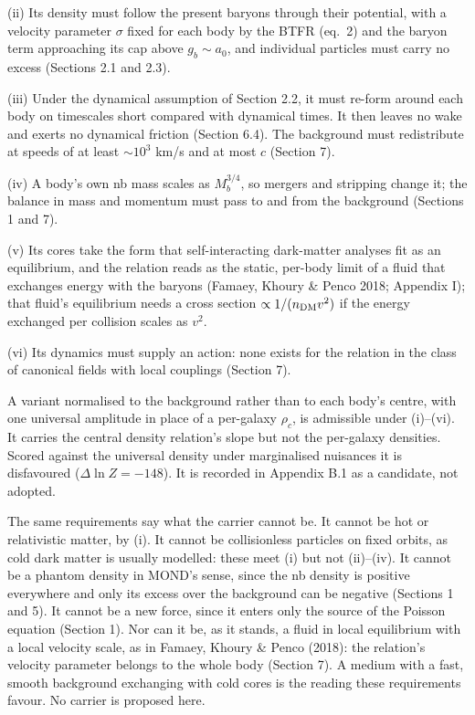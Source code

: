 \documentclass[
  10pt,
]{article}
\begin{document}
(ii) Its density must follow the present baryons through their potential, with a velocity parameter $\sigma$ fixed for each body by the BTFR (eq.~2) and the baryon term approaching its cap above $g_b\sim a_0$, and individual particles must carry no excess (Sections 2.1 and 2.3).

(iii) Under the dynamical assumption of Section 2.2, it must re-form around each body on timescales short compared with dynamical times. It then leaves no wake and exerts no dynamical friction (Section 6.4). The background must redistribute at speeds of at least $\sim10^3$ km/s and at most $c$ (Section 7).

(iv) A body's own nb mass scales as $M_b^{3/4}$, so mergers and stripping change it; the balance in mass and momentum must pass to and from the background (Sections 1 and 7).

(v) Its cores take the form that self-interacting dark-matter analyses fit as an equilibrium, and the relation reads as the static, per-body limit of a fluid that exchanges energy with the baryons (Famaey, Khoury \& Penco 2018; Appendix I); that fluid's equilibrium needs a cross section $\propto1/(n_{\rm DM}v^2)$ if the energy exchanged per collision scales as $v^2$.

(vi) Its dynamics must supply an action: none exists for the relation in the class of canonical fields with local couplings (Section 7).

A variant normalised to the background rather than to each body's centre, with one universal amplitude in place of a per-galaxy $\rho_c$, is admissible under (i)--(vi). It carries the central density relation's slope but not the per-galaxy densities. Scored against the universal density under marginalised nuisances it is disfavoured ($\Delta\ln Z=-148$). It is recorded in Appendix B.1 as a candidate, not adopted.

The same requirements say what the carrier cannot be. It cannot be hot or relativistic matter, by (i). It cannot be collisionless particles on fixed orbits, as cold dark matter is usually modelled: these meet (i) but not (ii)--(iv). It cannot be a phantom density in MOND's sense, since the nb density is positive everywhere and only its excess over the background can be negative (Sections 1 and 5). It cannot be a new force, since it enters only the source of the Poisson equation (Section 1). Nor can it be, as it stands, a fluid in local equilibrium with a local velocity scale, as in Famaey, Khoury \& Penco (2018): the relation's velocity parameter belongs to the whole body (Section 7). A medium with a fast, smooth background exchanging with cold cores is the reading these requirements favour. No carrier is proposed here.
\end{document}
